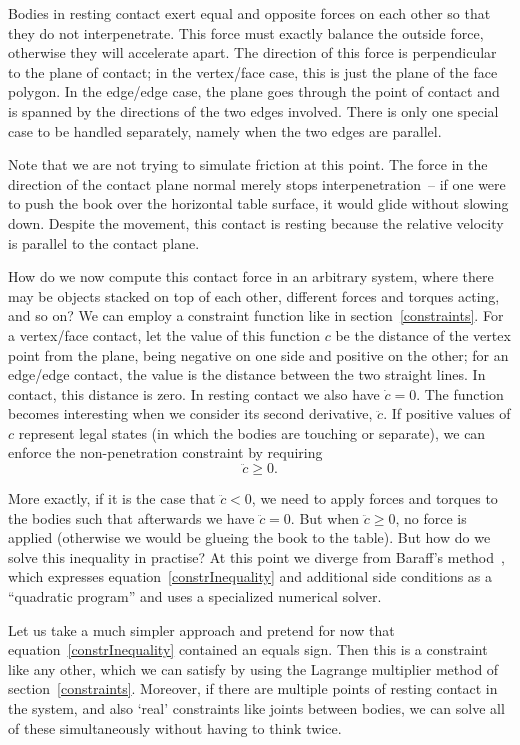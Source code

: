 Bodies in resting contact exert equal and opposite forces on each other so that they do not
interpenetrate. This force must exactly balance the outside force, otherwise they will accelerate
apart. The direction of this force is perpendicular to the plane of contact; in the vertex/face
case, this is just the plane of the face polygon. In the edge/edge case, the plane goes
through the point of contact and is spanned by the directions of the two edges involved.
There is only one special case to be handled separately, namely when the two edges are parallel.

Note that we are not trying to simulate friction at this point. The force in the direction of the
contact plane normal merely stops interpenetration~-- if one were to push the book over the
horizontal table surface, it would glide without slowing down. Despite the movement, this contact
is resting because the relative velocity is parallel to the contact plane.

How do we now compute this contact force in an arbitrary system, where there may be objects stacked
on top of each other, different forces and torques acting, and so on? We can employ a constraint
function like in section~\ref{constraints}. For a vertex/face contact, let the value of this
function $c$ be the distance of the vertex point from the plane, being negative on
one side and positive on the other; for an edge/edge contact, the value is the distance between the
two straight lines. In contact, this distance is zero. In resting contact we also have
$\dot{c} = 0$. The function becomes interesting when we consider its second
derivative, $\ddot{c}$. If positive values of $c$ represent legal states (in which the
bodies are touching or separate), we can enforce the non-penetration constraint by requiring
\begin{equation} \label{constrInequality}
\ddot{c} \ge 0.
\end{equation}

More exactly, if it is the case that $\ddot{c} < 0$, we need to apply forces and torques
to the bodies such that afterwards we have $\ddot{c} = 0$. But when
$\ddot{c} \ge 0$, no force is applied (otherwise we would be glueing the book to the
table). But how do we solve this inequality in practise? At this point we diverge from Baraff's
method~\cite{BaraffWitkin:97}, which expresses equation~\ref{constrInequality} and additional
side conditions as a ``quadratic program'' and uses a specialized numerical solver.

Let us take a much simpler approach and pretend for now that equation~\ref{constrInequality}
contained an equals sign. Then this is a constraint like any other, which we can satisfy by using
the Lagrange multiplier method of section~\ref{constraints}. Moreover, if there are multiple
points of resting contact in the system, and also `real' constraints like joints between bodies,
we can solve all of these simultaneously without having to think twice.

